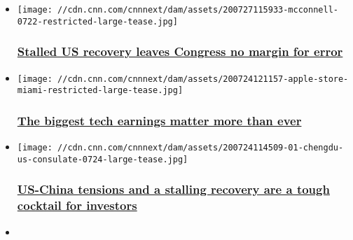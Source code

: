 \begin{itemize}
\item
  \href{/2020/07/27/investing/premarket-stocks-trading/index.html}{}

  \texttt{[image: //cdn.cnn.com/cnnnext/dam/assets/200727115933-mcconnell-0722-restricted-large-tease.jpg]}

  \hypertarget{stalled-us-recovery-leaves-congress-no-margin-for-error}{%
  \subsubsection{\texorpdfstring{\href{/2020/07/27/investing/premarket-stocks-trading/index.html}{Stalled
  US recovery leaves Congress no margin for
  error}}{Stalled US recovery leaves Congress no margin for error}}\label{stalled-us-recovery-leaves-congress-no-margin-for-error}}
\item
  \href{/2020/07/26/investing/stocks-week-ahead/index.html}{}

  \texttt{[image: //cdn.cnn.com/cnnnext/dam/assets/200724121157-apple-store-miami-restricted-large-tease.jpg]}

  \hypertarget{the-biggest-tech-earnings-matter-more-than-ever}{%
  \subsubsection{\texorpdfstring{\href{/2020/07/26/investing/stocks-week-ahead/index.html}{The
  biggest tech earnings matter more than
  ever}}{The biggest tech earnings matter more than ever}}\label{the-biggest-tech-earnings-matter-more-than-ever}}
\item
  \href{/2020/07/24/investing/premarket-stocks-trading/index.html}{}

  \texttt{[image: //cdn.cnn.com/cnnnext/dam/assets/200724114509-01-chengdu-us-consulate-0724-large-tease.jpg]}

  \hypertarget{us-china-tensions-and-a-stalling-recovery-are-a-tough-cocktail-for-investors}{%
  \subsubsection{\texorpdfstring{\href{/2020/07/24/investing/premarket-stocks-trading/index.html}{US-China
  tensions and a stalling recovery are a tough cocktail for
  investors}}{US-China tensions and a stalling recovery are a tough cocktail for investors}}\label{us-china-tensions-and-a-stalling-recovery-are-a-tough-cocktail-for-investors}}
\item
  \href{/2020/07/23/investing/premarket-stocks-trading/index.html}{}


\end{itemize}
